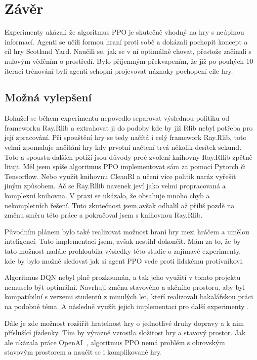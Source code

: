 \chapter{Závěr}
\label{ch:zaver}

Experimenty ukázali že algoritmus PPO je skutečně vhodný na hry s neúplnou informací.
Agenti se učili formou hraní proti sobě a dokázali pochopit koncept a cíl hry Scotland Yard.
Naučili se, jak se v ní optimálně chovat, přestože začínali s nulovým věděním o prostředí.
Bylo příjemným překvapením, že již po pouhých 10 iterací trénování byli agenti schopni projevovat náznaky pochopení cíle hry.

\section*{Možná vylepšení}
\label{sec:mozna-vylepseni}

Bohužel se během experimentu nepovedlo separovat výslednou politiku od frameworku Ray.Rlib a extrahovat ji do podoby kde by již Rlib nebyl potřeba pro její zpracování.
Při spouštění hry se tedy načítá i celý framework Ray.Rlib, toto velmi zpomaluje načítání hry kdy prvotní načtení trvá několik desítek sekund.
Toto a spoustu dalších potíží jsou důvody proč zvolení knihovny Ray.Rllib zpětně lituji.
Měl jsem spíše algoritmus PPO implementovat sám za pomocí Pytorch či Tensorflow.
Nebo využít knihovnu CleanRl a učení více politik naráz vyřešit jiným způsobem.
Ač se Ray.Rllib navenek jeví jako velmi propracovaná a komplexní knihovna.
V praxi se ukázalo, že obsahuje mnoho chyb a nekompletních řešení.
Tuto zkutečnost jsem avšak odhalil až příliš pozdě na změnu směru této práce a pokračoval jsem s knihovnou Ray.Rlib.

Původním plánem bylo také realizovat možnost hraní hry mezi hráčem a umělou inteligencí.
Tuto implementaci jsem, avšak nestihl dokončit.
Mám za to, že by tato možnost nadále prohloubila výsledky této studie o zajímavé experimenty, kde by bylo možné sledovat jak si agent PPO vede proti lidskému protivníkovi.

Algoritmus DQN nebyl plně prozkoumán, a tak jeho využití v tomto projektu nemuselo být optimální.
Navrhuji změnu stavového a akčního prostoru, aby byl kompatibilní s verzemi studentů z minulých let, kteří realizovali bakalářskou práci na podobné téma.
A následně využít jejich implementaci pro další experimenty \cite{Hrklova2023thesis}.

Dále je zde možnost rozšířit hratelnost hry o jednotlivé druhy dopravy a k nim příslušící jízdenky.
Tím by výrazně vzrostla složitost hry a stavový prostor.
Jak ale ukázala práce OpenAI~\cite{Dota2}, algoritmus PPO nemá problém s obrovským stavovým prostorem a naučit se i komplikované hry.




%
